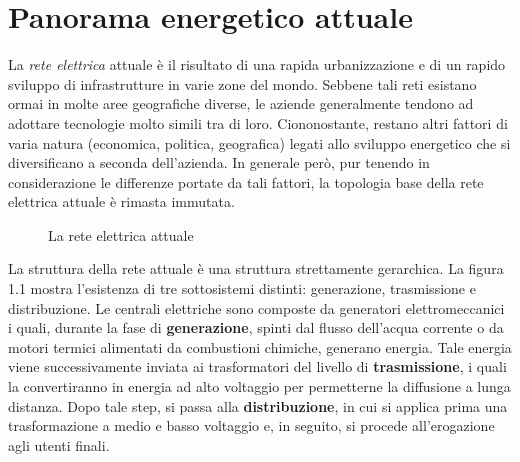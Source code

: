 \section{Panorama energetico attuale}
La \textit{rete elettrica} attuale è il risultato di una rapida urbanizzazione e di un rapido sviluppo di infrastrutture in varie zone del mondo. Sebbene tali reti esistano ormai in molte aree geografiche diverse, le aziende generalmente tendono ad adottare tecnologie molto simili tra di loro. Ciononostante, restano altri fattori  di varia natura (economica, politica, geografica) legati allo sviluppo energetico che si diversificano a seconda dell'azienda. \newline
In generale però, pur tenendo in considerazione le differenze portate da tali fattori, la topologia base della rete elettrica attuale è rimasta immutata.
\begin{figure}[h] 
\caption{La rete elettrica attuale}
\end{figure}
\newline La struttura della rete attuale è una struttura strettamente gerarchica. La figura 1.1 mostra l'esistenza di tre sottosistemi distinti: generazione, trasmissione e distribuzione. \newline Le centrali elettriche sono composte da generatori elettromeccanici i quali, durante la fase di \textbf{generazione}, spinti dal flusso dell'acqua corrente o da motori termici alimentati da combustioni chimiche, generano energia. Tale energia viene successivamente inviata ai trasformatori del livello di \textbf{trasmissione}, i quali la convertiranno in energia ad alto voltaggio per permetterne la diffusione a lunga distanza. Dopo tale step, si passa alla \textbf{distribuzione}, in cui si applica prima una trasformazione a medio e basso voltaggio e, in seguito, si procede all'erogazione agli utenti finali.
